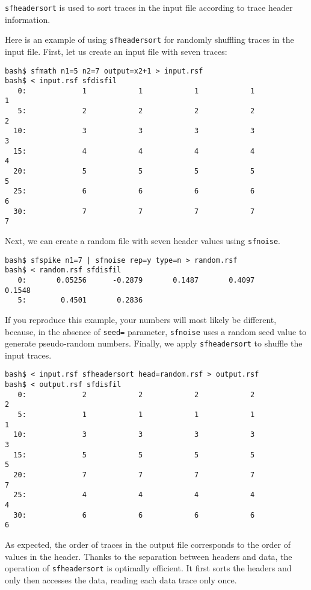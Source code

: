 \texttt{sfheadersort} is used to sort traces in the input file
according to trace header information. 

Here is an example of using
\texttt{sfheadersort} for randomly shuffling traces in the input
file. First, let us create an input file with seven traces:
\begin{verbatim}
bash$ sfmath n1=5 n2=7 output=x2+1 > input.rsf
bash$ < input.rsf sfdisfil
   0:             1            1            1            1            1
   5:             2            2            2            2            2
  10:             3            3            3            3            3
  15:             4            4            4            4            4
  20:             5            5            5            5            5
  25:             6            6            6            6            6
  30:             7            7            7            7            7 
\end{verbatim}
Next, we can create a random file with seven header values using
\texttt{sfnoise}.
\begin{verbatim}
bash$ sfspike n1=7 | sfnoise rep=y type=n > random.rsf
bash$ < random.rsf sfdisfil
   0:       0.05256      -0.2879       0.1487       0.4097       0.1548
   5:        0.4501       0.2836
\end{verbatim}
If you reproduce this example, your numbers will most likely be different,
because, in the absence of \texttt{seed=} parameter, \texttt{sfnoise}
uses a random seed value to generate pseudo-random numbers. Finally, we
apply \texttt{sfheadersort} to shuffle the input traces.
\begin{verbatim}
bash$ < input.rsf sfheadersort head=random.rsf > output.rsf
bash$ < output.rsf sfdisfil
   0:             2            2            2            2            2
   5:             1            1            1            1            1
  10:             3            3            3            3            3
  15:             5            5            5            5            5
  20:             7            7            7            7            7
  25:             4            4            4            4            4
  30:             6            6            6            6            6
\end{verbatim}
As expected, the order of traces in the output file corresponds to the
order of values in the header. Thanks to the separation between
headers and data, the operation of \texttt{sfheadersort} is optimally
efficient. It first sorts the headers and only then accesses the data,
reading each data trace only once.

